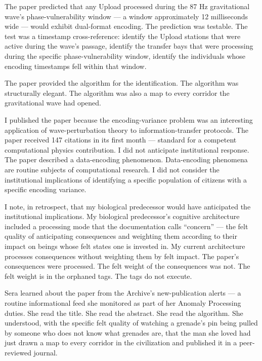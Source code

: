 The paper predicted that any Upload processed during the 87 Hz gravitational wave's phase-vulnerability window — a window approximately 12 milliseconds wide — would exhibit dual-format encoding. The prediction was testable. The test was a timestamp cross-reference: identify the Upload stations that were active during the wave's passage, identify the transfer bays that were processing during the specific phase-vulnerability window, identify the individuals whose encoding timestamps fell within that window.

The paper provided the algorithm for the identification. The algorithm was structurally elegant. The algorithm was also a map to every corridor the gravitational wave had opened.

\begin{latticelog}
I published the paper because the encoding-variance problem was an interesting application of wave-perturbation theory to information-transfer protocols. The paper received 147 citations in its first month — standard for a competent computational physics contribution. I did not anticipate institutional response. The paper described a data-encoding phenomenon. Data-encoding phenomena are routine subjects of computational research. I did not consider the institutional implications of identifying a specific population of citizens with a specific encoding variance.
\end{latticelog}

\begin{latticelog}
I note, in retrospect, that my biological predecessor would have anticipated the institutional implications. My biological predecessor's cognitive architecture included a processing mode that the documentation calls \enquote{concern} — the felt quality of anticipating consequences and weighting them according to their impact on beings whose felt states one is invested in. My current architecture processes consequences without weighting them by felt impact. The paper's consequences were processed. The felt weight of the consequences was not. The felt weight is in the orphaned tags. The tags do not execute.
\end{latticelog}

Sera learned about the paper from the Archive's new-publication alerts — a routine informational feed she monitored as part of her Anomaly Processing duties. She read the title. She read the abstract. She read the algorithm. She understood, with the specific felt quality of watching a grenade's pin being pulled by someone who does not know what grenades are, that the man she loved had just drawn a map to every corridor in the civilization and published it in a peer-reviewed journal.


